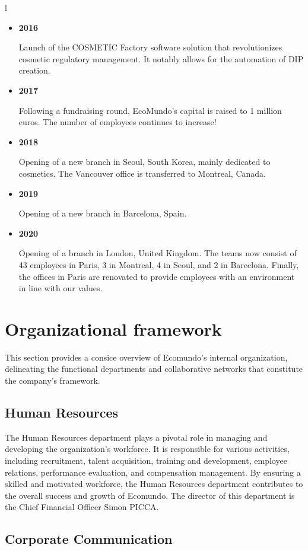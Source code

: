 l\documentclass[a4paper,12pt,twoside]{report}
\begin{document}
\begin{itemize}
\item \textbf{2016}

Launch of the COSMETIC Factory software solution that revolutionizes cosmetic regulatory management. It notably allows for the automation of DIP creation.

\item \textbf{2017}

Following a fundraising round, EcoMundo's capital is raised to 1 million euros. The number of employees continues to increase!

\item \textbf{2018}

Opening of a new branch in Seoul, South Korea, mainly dedicated to cosmetics. The Vancouver office is transferred to Montreal, Canada.

\item \textbf{2019}

Opening of a new branch in Barcelona, Spain.

\item \textbf{2020}

Opening of a branch in London, United Kingdom. The teams now consist of 43 employees in Paris, 3 in Montreal, 4 in Seoul, and 2 in Barcelona. Finally, the offices in Paris are renovated to provide employees with an environment in line with our values.
\end{itemize}
\section{Organizational framework}
This section provides a consice overview of Ecomundo's internal organization, delineating the functional departments and collaborative networks that constitute the company's framework.
\subsection{Human Resources}

The Human Resources department plays a pivotal role in managing and developing the organization's workforce. It is responsible for various activities, including recruitment, talent acquisition, training and development, employee relations, performance evaluation, and compensation management. By ensuring a skilled and motivated workforce, the Human Resources department contributes to the overall success and growth of Ecomundo. The director of this department is the Chief Financial Officer Simon PICCA.

\subsection{Corporate Communication}
\end{document}
